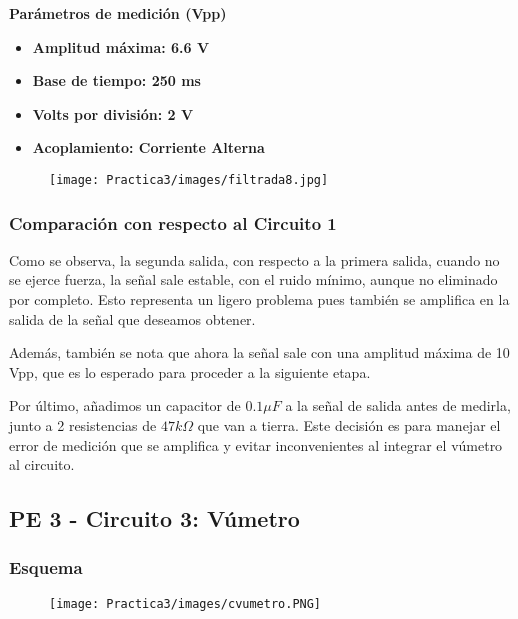 \documentclass[12pt]{article}
\begin{document}
            \textbf{Parámetros de medición (Vpp)}
            \begin{multicols}{2}
                \begin{itemize}
                    \item[\checkmark] \textbf{Amplitud máxima: 6.6 V}
                    \item[\checkmark] \textbf{Base de tiempo: 250 ms}
            \columnbreak
                    \item[\checkmark] \textbf{Volts por división: 2 V}
                    \item[\checkmark] \textbf{Acoplamiento: Corriente Alterna}
                \end{itemize}
            \end{multicols}
         
            \begin{figure}[h!]
                \centering
                \texttt{[image: Practica3/images/filtrada8.jpg]}
            \end{figure}
            
            
            
	\subsubsection{Comparación con respecto al Circuito 1}
	
	Como se observa, la segunda salida, con respecto a la primera salida, cuando no se ejerce fuerza, la señal sale estable, con el ruido mínimo, aunque no eliminado por completo. Esto representa un ligero problema pues también se amplifica en la salida de la señal que deseamos obtener. 
	
	Además, también se nota que ahora la señal sale con una amplitud máxima de 10 Vpp, que es lo esperado para proceder a la siguiente etapa.
	
	Por último, añadimos un capacitor de $0.1 \mu F$ a la señal de salida antes de medirla, junto a 2 resistencias de $47 k \Omega$ que van a tierra. Este decisión es para manejar el error de medición que se amplifica y evitar inconvenientes al integrar el vúmetro al circuito.
	
	
	\subsection{PE 3 - Circuito 3: Vúmetro}
	\subsubsection{Esquema}
	\begin{figure}[h!]
                \centering
                \texttt{[image: Practica3/images/cvumetro.PNG]}
    \end{figure} 
    \newpage
\end{document}
